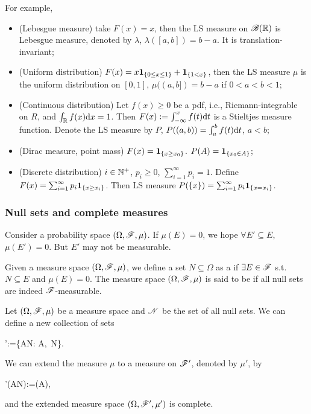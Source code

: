 \documentclass[10pt,a4paper]{article}
\begin{document}
For example,
\begin{itemize}
	\item (Lebesgue measure) take $F(x)=x$, then the LS measure on $\mathscr{B}(\mathbb R)$ is Lebesgue measure, denoted by $\lambda$, $\lambda([a,b])=b-a$. It is translation-invariant;
	\item (Uniform distribution) $F(x)=x{\boldsymbol 1}_{\{0\leq x\leq 1\}}+ {\boldsymbol 1}_{\{1<x\}}$, then the LS measure $\mu$ is the uniform distribution on $[0,1]$, $\mu((a,b])=b-a$ if $0<a<b<1$;
	\item (Continuous distribution) Let $f(x)\geq 0$ be a pdf, i.e., Riemann-integrable on $R$, and $\int_{\mathbb R}f(x)\mathrm{d} x=1$. Then $F(x):=\int_{-\infty }^{x}f(t)\mathrm{d} t$ is a Stieltjes measure function. Denote the LS measure by $P$, $P((a,b))=\int_{a}^{b}f(t)\mathrm{d} t$, $a<b$;   
	\item (Dirac measure, point mass) $F(x)={\boldsymbol 1}_{\{x\geq x_0\}}$. $P(A)={\boldsymbol 1}_{\{x_0\in A\}}$;
	\item (Discrete distribution) $i\in\mathbb N^+$, $p_i\geq 0$, $\sum_{i=1}^{\infty }p_i=1$. Define $F(x)=\sum_{i=1}^{\infty }p_i{\boldsymbol 1}_{\{x\geq x_i\}}$. Then LS measure $P(\{x\})=\sum_{i=1}^{\infty }p_i{\boldsymbol 1}_{\{x=x_i\}}$.
\end{itemize}

\subsubsection{Null sets and complete measures}\label{sec:null-complete}
Consider a probability space $(\Omega,\mathscr{F},\mu)$. If $\mu(E)=0$, we hope $\forall E'\subseteq E$, $\mu(E')=0$. But $E'$ may not be measurable.
\begin{defbox}
	\begin{definition}\label{def:null-complete}
		Given a measure space $(\Omega,\mathscr{F},\mu)$, we define a set $N\subseteq \Omega$ as a  if $\exists E\in\mathscr{F}$ s.t. $N\subseteq E$ and $\mu(E)=0$. The measure space $(\Omega,\mathscr{F},\mu)$ is said to be  if all null sets are indeed $\mathscr{F}$-measurable. 
	\end{definition}
\end{defbox}     

\begin{thmbox}
	\begin{theorem}[Completion]\label{thm:null-completion}
		Let $(\Omega,\mathscr{F},\mu)$ be a measure space and $\mathscr{N}$ be the set of all null sets. We can define a new collection of sets
		\begin{sequation*}
			\scrF':=\{A\cup N: A\in\scrF,\ N\in\scrN\}.
		\end{sequation*}
		We can extend the measure $\mu$ to a measure on $\mathscr{F}'$, denoted by $\mu'$, by 
		\begin{sequation*}
			\mu'(A\cup N):=\mu(A),
		\end{sequation*}   
		and the extended measure space $(\Omega,\mathscr{F}',\mu')$ is complete. 
	\end{theorem}
\end{thmbox}
\end{document}
